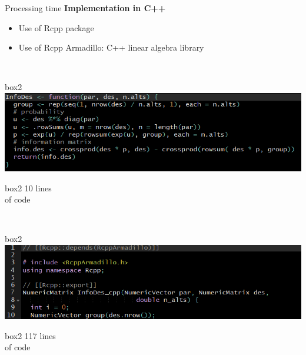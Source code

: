 \documentclass[11pt,t]{beamer}
\begin{document}
\begin{frame}[fragile]{Processing time}
\textbf{Implementation in C++}
\begin{itemize}
	\item Use of Rcpp package
	\item Use of Rcpp Armadillo: C++ linear algebra library
\end{itemize}
\vspace*{-3mm}
	\pause
	\begin{center}~
		\begin{beamercolorbox}[wd=.85\textwidth,sep=4pt,center]{box2}	
		\includegraphics[scale = .7]{mygraphics/Code1.png}
		\end{beamercolorbox}
		\hspace{2pt}
		\begin{beamercolorbox}[wd=.1\textwidth,sep=4pt,center]{box2}	
		 10 lines \\ of code
		\end{beamercolorbox}
	\end{center}
	\vspace*{-7mm}
	\pause
	\begin{center}~
		\begin{beamercolorbox}[wd=.85\textwidth,sep=4pt,center]{box2}	
		\includegraphics[scale = .7]{mygraphics/Code2.png}
		\end{beamercolorbox}
		\hspace{2pt}
		\begin{beamercolorbox}[wd=.1\textwidth,sep=4pt,center]{box2}	
		 117 lines \\ of code
		\end{beamercolorbox}
	\end{center}
\end{frame}
\end{document}
